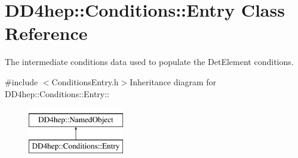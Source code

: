 \hypertarget{class_d_d4hep_1_1_conditions_1_1_entry}{
\section{DD4hep::Conditions::Entry Class Reference}
\label{class_d_d4hep_1_1_conditions_1_1_entry}
}


The intermediate conditions data used to populate the DetElement conditions.  


{\ttfamily \#include $<$ConditionsEntry.h$>$}Inheritance diagram for DD4hep::Conditions::Entry::\begin{figure}[H]
\begin{center}
\leavevmode
\includegraphics[height=2cm]{class_d_d4hep_1_1_conditions_1_1_entry}
\end{center}
\end{figure}
